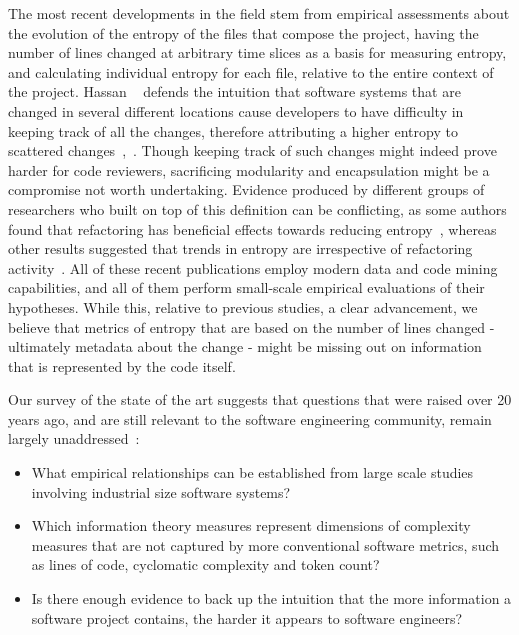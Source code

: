 \documentclass[10pt,conference]{IEEEtran}
\begin{document}
The most recent developments in the field stem from empirical assessments about the evolution of the entropy of the files that compose the project, having the number of lines changed at arbitrary time slices as a basis for measuring entropy, and calculating individual entropy for each file, relative to the entire context of the project. Hassan ~\cite{hassan2009predicting} defends the intuition that software systems that are changed in several different locations cause developers to have difficulty in keeping track of all the changes, therefore attributing a higher entropy to scattered changes~\cite{hassan2009predicting},~\cite{canfora2014changes}. Though keeping track of such changes might indeed prove harder for code reviewers, sacrificing modularity and encapsulation might be a compromise not worth undertaking. Evidence produced by different groups of researchers who built on top of this definition can be conflicting, as some authors found that refactoring has beneficial effects towards reducing entropy~\cite{canfora2014changes}, whereas other results suggested that trends in entropy are irrespective of refactoring activity~\cite{keenan2022investigation}. All of these recent publications employ modern data and code mining capabilities, and all of them perform small-scale empirical evaluations of their hypotheses. While this, relative to previous studies, a clear advancement, we believe that metrics of entropy that are based on the number of lines changed - ultimately metadata about the change - might be missing out on information that is represented by the code itself.

Our survey of the state of the art suggests that questions that were raised over 20 years ago, and are still relevant to the software engineering community, remain largely unaddressed~\cite{Khoshgoftaar1994ApplicationsOI}:
\begin{itemize}
    \item What empirical relationships can be established from large scale studies involving industrial size software systems?
    \item Which information theory measures represent dimensions of complexity measures that are not captured by more conventional software metrics, such as lines of code, cyclomatic complexity and token count?
    \item Is there enough evidence to back up the intuition that the more information a software project contains, the harder it appears to software engineers?
\end{itemize}
\end{document}
